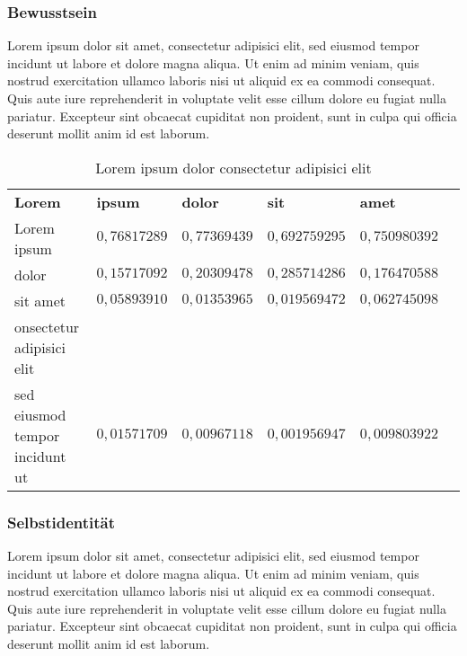 \subsubsection{Bewusstsein}
Lorem ipsum dolor sit amet, consectetur adipisici elit, sed eiusmod tempor incidunt ut labore et dolore magna aliqua. Ut enim ad minim veniam, quis nostrud exercitation ullamco laboris nisi ut aliquid ex ea commodi consequat. Quis aute iure reprehenderit in voluptate velit esse cillum dolore eu fugiat nulla pariatur. Excepteur sint obcaecat cupiditat non proident, sunt in culpa qui officia deserunt mollit anim id est laborum.
%
\begin{tiny}
\begin{table}[!ht]
     \centering
     \begin{tabular}{llllll}
       \textbf{Lorem}  &\textbf{ipsum} & \textbf{dolor} & \textbf{sit} & \textbf{amet} \\
       Lorem ipsum  &  $0{,}76817289$ &  $0{,}77369439$ &  $0{,}692759295$  & $0{,}750980392$ \\
       dolor        & $0{,}15717092$ &  $0{,}20309478$ &  $0{,}285714286$ &  $0{,}176470588$ \\
       sit amet  &  $0{,}05893910$ & $0{,}01353965$ &  $0{,}019569472$ &  $0{,}062745098$ \\
       onsectetur adipisici elit \\sed eiusmod tempor incidunt ut & $0{,}01571709$ & $0{,}00967118$ & $0{,}001956947$ &  $ 0{,}009803922$  \\
     \end{tabular}

     \caption{Lorem ipsum dolor consectetur adipisici elit}
     \label{tbl:Tabellen 3}

   \end{table}
\end{tiny}
%

\subsubsection{Selbstidentität}
Lorem ipsum dolor sit amet, consectetur adipisici elit, sed eiusmod tempor incidunt ut labore et dolore magna aliqua. Ut enim ad minim veniam, quis nostrud exercitation ullamco laboris nisi ut aliquid ex ea commodi consequat. Quis aute iure reprehenderit in voluptate velit esse cillum dolore eu fugiat nulla pariatur. Excepteur sint obcaecat cupiditat non proident, sunt in culpa qui officia deserunt mollit anim id est laborum.

